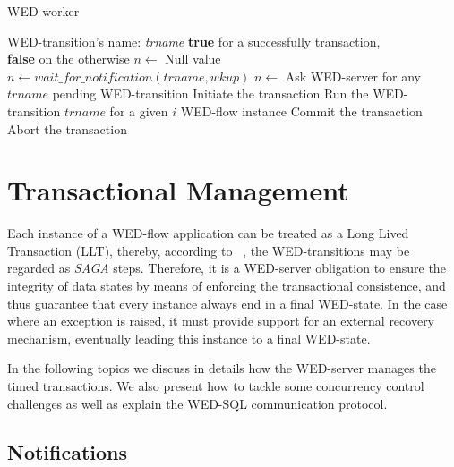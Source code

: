 \documentclass[12pt]{article}
\begin{document}
\begin{algorithm}
\caption{WED-worker}
\label{alg2}
\begin{algorithmic}[1]
\REQUIRE WED-transition's name: \emph{trname}
\ENSURE \textbf{true} for a successfully transaction,\\
         \hspace{23pt}\textbf{false} on the otherwise
\LOOP
\STATE $n \leftarrow$ Null value
\STATE $n \leftarrow wait\_for\_notification(trname,wkup)$
\STATE $n \leftarrow $ Ask WED-server for any $trname$ pending WED-transition
\ENDIF
\ENDWHILE
\STATE Initiate the transaction
\STATE Run the WED-transition $trname$ for a given $i$ WED-flow instance
\STATE Commit the transaction
\RETURN \TRUE
\ELSE
\STATE Abort the transaction
\RETURN \FALSE
\ENDIF  
\ENDLOOP

\end{algorithmic}
\end{algorithm}

\section{Transactional Management}
\label{GT}

Each instance of a WED-flow application can be treated as a Long Lived Transaction (LLT), thereby, according to ~\cite{SGD87},
the WED-transitions may be regarded as \emph{SAGA} steps. Therefore, it is a WED-server obligation to ensure the integrity
of data states by means of enforcing the transactional consistence, and thus guarantee that every instance always end in
a final WED-state. In the case where an exception is raised, it must provide support for an external recovery mechanism,
eventually leading this instance to a final WED-state. 

\par In the following topics we discuss in details how the WED-server manages the timed transactions. We also present how
to tackle some concurrency control challenges as well as explain the WED-SQL communication protocol. 

\subsection{Notifications}
\label{not}
\end{document}
